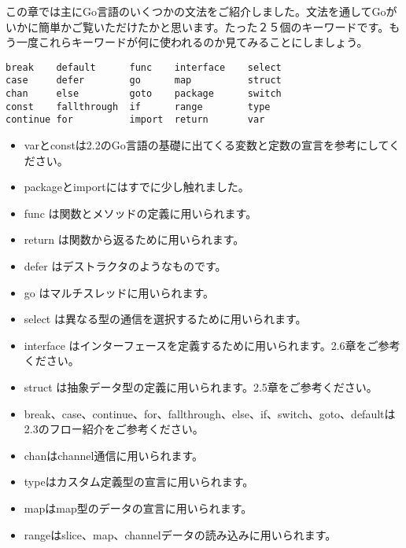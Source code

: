 この章では主にGo言語のいくつかの文法をご紹介しました。文法を通してGoがいかに簡単かご覧いただけたかと思います。たった２５個のキーワードです。もう一度これらキーワードが何に使われるのか見てみることにしましょう。

\begin{lstlisting}[numbers=none]
break    default      func    interface    select
case     defer        go      map          struct
chan     else         goto    package      switch
const    fallthrough  if      range        type
continue for          import  return       var
\end{lstlisting}


\begin{itemize}
  \item varとconstは2.2のGo言語の基礎に出てくる変数と定数の宣言を参考にしてください。
  \item packageとimportにはすでに少し触れました。
  \item func は関数とメソッドの定義に用いられます。
  \item return は関数から返るために用いられます。
  \item defer はデストラクタのようなものです。
  \item go はマルチスレッドに用いられます。
  \item select は異なる型の通信を選択するために用いられます。
  \item interface はインターフェースを定義するために用いられます。2.6章をご参考ください。
  \item struct は抽象データ型の定義に用いられます。2.5章をご参考ください。
  \item break、case、continue、for、fallthrough、else、if、switch、goto、defaultは2.3のフロー紹介をご参考ください。
  \item chanはchannel通信に用いられます。
  \item typeはカスタム定義型の宣言に用いられます。
  \item mapはmap型のデータの宣言に用いられます。
  \item rangeはslice、map、channelデータの読み込みに用いられます。
\end{itemize}
